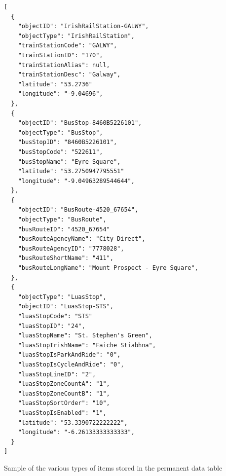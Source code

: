 \documentclass[a4paper,11pt]{report}
\newenvironment{code}{\captionsetup{type=listing}}{}
\begin{document}
\begin{code}
\begin{verbatim}
[
  {
    "objectID": "IrishRailStation-GALWY",
    "objectType": "IrishRailStation",
    "trainStationCode": "GALWY",
    "trainStationID": "170",
    "trainStationAlias": null,
    "trainStationDesc": "Galway",
    "latitude": "53.2736"
    "longitude": "-9.04696",
  },
  {
    "objectID": "BusStop-8460B5226101",
    "objectType": "BusStop",
    "busStopID": "8460B5226101",
    "busStopCode": "522611",
    "busStopName": "Eyre Square",
    "latitude": "53.2750947795551"
    "longitude": "-9.04963289544644",
  },
  {
    "objectID": "BusRoute-4520_67654",
    "objectType": "BusRoute",
    "busRouteID": "4520_67654"
    "busRouteAgencyName": "City Direct",
    "busRouteAgencyID": "7778028",
    "busRouteShortName": "411",
    "busRouteLongName": "Mount Prospect - Eyre Square",
  },
  {
    "objectType": "LuasStop",
    "objectID": "LuasStop-STS",
    "luasStopCode": "STS"
    "luasStopID": "24",
    "luasStopName": "St. Stephen's Green",
    "luasStopIrishName": "Faiche Stiabhna",
    "luasStopIsParkAndRide": "0",
    "luasStopIsCycleAndRide": "0",
    "luasStopLineID": "2",
    "luasStopZoneCountA": "1",
    "luasStopZoneCountB": "1",
    "luasStopSortOrder": "10",
    "luasStopIsEnabled": "1",
    "latitude": "53.3390722222222",
    "longitude": "-6.26133333333333",
  }
]
\end{verbatim}
\caption{Sample of the various types of items stored in the permanent data table}
\end{code}
\end{document}
